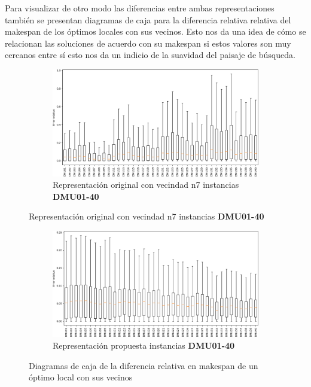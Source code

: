 Para visualizar de otro modo las diferencias entre ambas representaciones también se presentan diagramas de caja para la diferencia relativa relativa del makespan de los óptimos locales con sus vecinos. Esto nos da una idea de cómo se relacionan las soluciones de acuerdo con su makespan si estos valores son muy cercanos entre sí esto nos da un indicio de la suavidad del paisaje de búsqueda.
\begin{figure}[H]
    \begin{subfigure}{\textwidth}
        \centering
        \includegraphics[scale=.6]{Imagenes/bxpn7_1.png}
        \caption{Representación original con vecindad n7 instancias \textbf{DMU01-40}}
    \end{subfigure}
\end{figure}
\begin{figure}[H]\ContinuedFloat
    \begin{subfigure}{\textwidth}
        \centering
        \includegraphics[scale=.6]{Imagenes/bxppr_1.png}
        \caption{Representación propuesta instancias \textbf{DMU01-40}}
    \end{subfigure}
    \caption{Diagramas de caja de la diferencia relativa en makespan de un óptimo local con sus vecinos}
    \label{fig:bxp1}
\end{figure}

